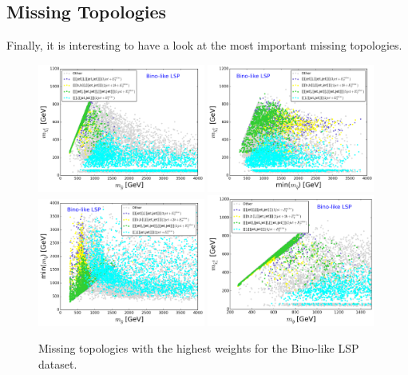 \documentclass[a4paper,11pt]{article}
\begin{document}
\subsection{Missing Topologies}
Finally, it is interesting to have a look at the most important missing topologies. 
\begin{figure}[!]
\begin{center}
\subfigure
\includegraphics[width=0.49\textwidth]{PLOTS/Missing/BINO_Missing_GluNeu.png}
\subfigure
{\includegraphics[width=0.49\textwidth]{PLOTS/Missing/BINO_Missing_SqNeu.png}}
\subfigure
{\includegraphics[width=0.49\textwidth]{PLOTS/Missing/BINO_Missing_GluSq.png}}
\subfigure
{\includegraphics[width=0.49\textwidth]{PLOTS/Missing/BINO_Zoom_Missing_GluNeu.png}}
\end{center}
\caption{Missing topologies with the highest weights for the Bino-like LSP dataset.} 
\label{Missing_Bino}
\end{figure}
\end{document}
